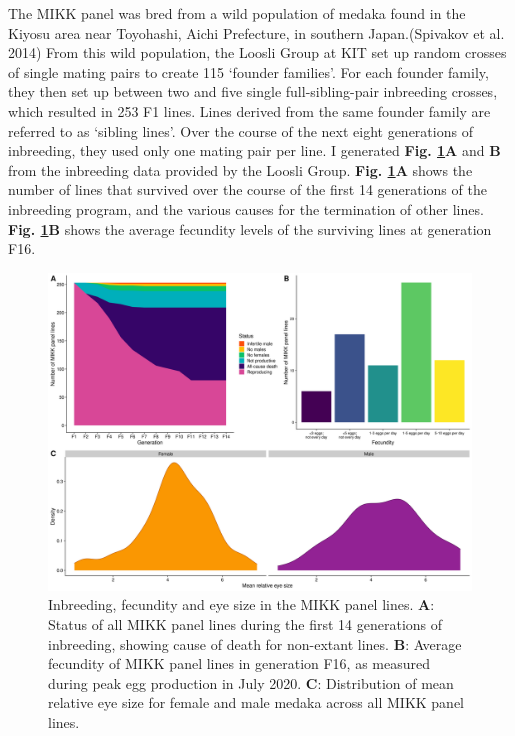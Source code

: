 \documentclass[
]{book}
\begin{document}
The MIKK panel was bred from a wild population of medaka found in the Kiyosu area near Toyohashi, Aichi Prefecture, in southern Japan.(Spivakov et al. 2014) From this wild population, the Loosli Group at KIT set up random crosses of single mating pairs to create 115 `founder families'. For each founder family, they then set up between two and five single full-sibling-pair inbreeding crosses, which resulted in 253 F1 lines. Lines derived from the same founder family are referred to as `sibling lines'. Over the course of the next eight generations of inbreeding, they used only one mating pair per line. I generated \textbf{Fig. \ref{fig:InbreedingFigure}A} and \textbf{B} from the inbreeding data provided by the Loosli Group. \textbf{Fig. \ref{fig:InbreedingFigure}A} shows the number of lines that survived over the course of the first 14 generations of the inbreeding program, and the various causes for the termination of other lines. \textbf{Fig. \ref{fig:InbreedingFigure}B} shows the average fecundity levels of the surviving lines at generation F16.



\begin{figure}
\includegraphics[width=1\linewidth]{figs/mikk_genome/20211213_final_figure} \caption{Inbreeding, fecundity and eye size in the MIKK panel lines. \textbf{A}: Status of all MIKK panel lines during the first 14 generations of inbreeding, showing cause of death for non-extant lines. \textbf{B}: Average fecundity of MIKK panel lines in generation F16, as measured during peak egg production in July 2020. \textbf{C}: Distribution of mean relative eye size for female and male medaka across all MIKK panel lines.}\label{fig:InbreedingFigure}
\end{figure}
\end{document}
